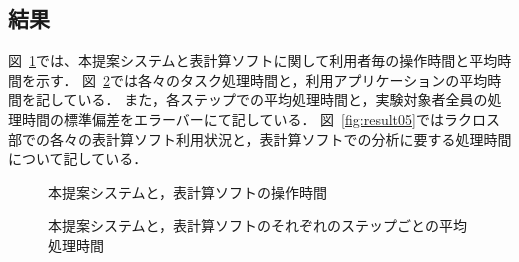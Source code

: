 \documentclass[sotsuron]{kuee}
\begin{document}
		\subsection{結果}
			図~\ref{fig:result03}では、本提案システムと表計算ソフトに関して利用者毎の操作時間と平均時間を示す．
			図~\ref{fig:result04}では各々のタスク処理時間と，利用アプリケーションの平均時間を記している．
			また，各ステップでの平均処理時間と，実験対象者全員の処理時間の標準偏差をエラーバーにて記している．
			図~\ref{fig:result05}ではラクロス部での各々の表計算ソフト利用状況と，表計算ソフトでの分析に要する処理時間について記している．
			\begin{figure}
				\begin{center}
				\end{center}
				\caption{本提案システムと，表計算ソフトの操作時間}
		  		\label{fig:result03}
			\end{figure}
			\begin{figure}
				\begin{center}
				\end{center}
				\caption{本提案システムと，表計算ソフトのそれぞれのステップごとの平均処理時間}
		  		\label{fig:result04}
			\end{figure}
\end{document}
